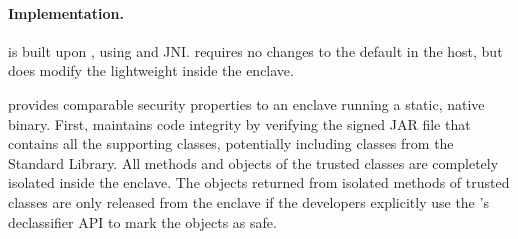 





\paragraph{Implementation.} \sysname{} is built upon \jvmname{}, using \java{} and JNI.
\sysname{} requires no changes to the default \jvm{} in the host,
but does modify the lightweight \jvm{} inside the enclave.


\sysname{} provides comparable security properties to an enclave running a static, native binary.
First, \sysname{} maintains code integrity by verifying the signed JAR file that contains all the supporting classes, potentially including classes from the \java{} Standard Library.
All methods and objects of the trusted classes are completely isolated 
inside the \sgx{} enclave.
The objects returned from isolated methods of trusted classes are only released
from the enclave if the developers explicitly use the \sysname{}'s declassifier API to mark the objects as safe.

